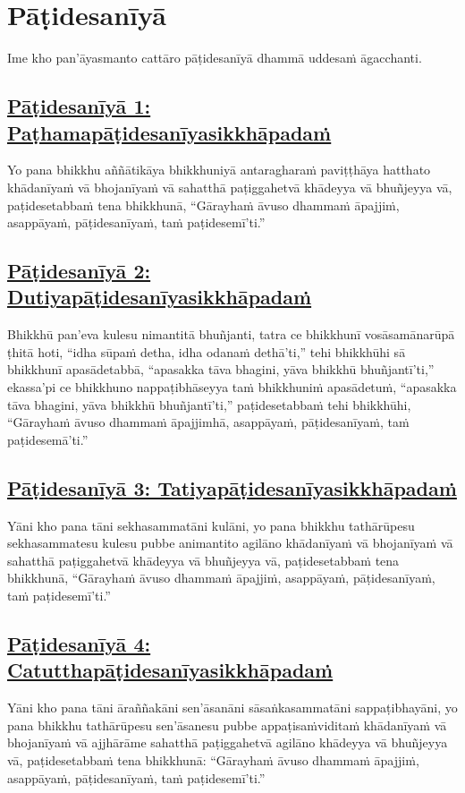 \section{Pāṭidesanīyā}
\label{pd}

\begin{intro}
  Ime kho pan'āyasmanto cattāro pāṭidesanīyā dhammā uddesaṁ āgacchanti.
\end{intro}

\setsubsecheadstyle{\subsubsectionFmt}
\subsection*{\hyperref[ack1]{Pāṭidesanīyā 1: Paṭhamapāṭidesanīyasikkhāpadaṁ}}
\label{pd1}
Yo pana bhikkhu aññātikāya bhikkhuniyā antaragharaṁ paviṭṭhāya hatthato khādanīyaṁ vā bhojanīyaṁ vā sahatthā paṭiggahetvā khādeyya vā bhuñjeyya vā, paṭidesetabbaṁ tena bhikkhunā, ``Gārayhaṁ āvuso dhammaṁ āpajjiṁ, asappāyaṁ, pāṭidesanīyaṁ, taṁ paṭidesemī'ti.''

\subsection*{\hyperref[ack2]{Pāṭidesanīyā 2: Dutiyapāṭidesanīyasikkhāpadaṁ}}
\label{pd2}
Bhikkhū pan'eva kulesu nimantitā bhuñjanti, tatra ce bhikkhunī vosāsamānarūpā ṭhitā hoti, ``idha sūpaṁ detha, idha odanaṁ dethā'ti,'' tehi bhikkhūhi sā bhikkhunī apasādetabbā, ``apasakka tāva bhagini, yāva bhikkhū bhuñjantī'ti,'' ekassa'pi ce bhikkhuno nappaṭibhāseyya taṁ bhikkhuniṁ apasādetuṁ, ``apasakka tāva bhagini, yāva bhikkhū bhuñjantī'ti,'' paṭidesetabbaṁ tehi bhikkhūhi, ``Gārayhaṁ āvuso dhammaṁ āpajjimhā, asappāyaṁ, pāṭidesanīyaṁ, taṁ paṭidesemā'ti.''

\subsection*{\hyperref[ack3]{Pāṭidesanīyā 3: Tatiyapāṭidesanīyasikkhāpadaṁ}}
\label{pd3}
Yāni kho pana tāni sekhasammatāni kulāni, yo pana bhikkhu tathārūpesu sekhasammatesu kulesu pubbe animantito agilāno khādanīyaṁ vā bhojanīyaṁ vā sahatthā paṭiggahetvā khādeyya vā bhuñjeyya vā, paṭidesetabbaṁ tena bhikkhunā, ``Gārayhaṁ āvuso dhammaṁ āpajjiṁ, asappāyaṁ, pāṭidesanīyaṁ, taṁ paṭidesemī'ti.''

\subsection*{\hyperref[ack4]{Pāṭidesanīyā 4: Catutthapāṭidesanīyasikkhāpadaṁ}}
\label{pd4}
Yāni kho pana tāni āraññakāni sen'āsanāni sāsaṅkasammatāni sappaṭibhayāni, yo pana bhikkhu tathārūpesu sen'āsanesu pubbe appaṭisaṁviditaṁ khādanīyaṁ vā bhojanīyaṁ vā ajjhārāme sahatthā paṭiggahetvā agilāno khādeyya vā bhuñjeyya vā, paṭidesetabbaṁ tena bhikkhunā: ``Gārayhaṁ āvuso dhammaṁ āpajjiṁ, asappāyaṁ, pāṭidesanīyaṁ, taṁ paṭidesemī'ti.''

